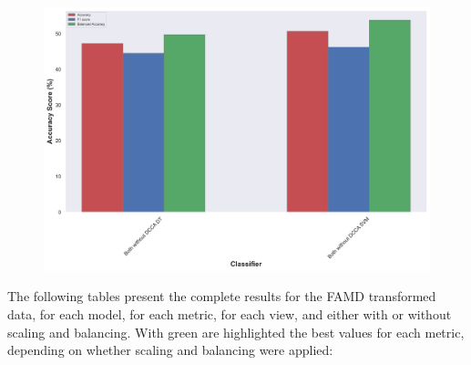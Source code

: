 {%

\begin{figure}[H]
    \centering
    \includegraphics[width=\textwidth]{figures/Results/FAMD/AdaBoost_FAMD_with.png}
    \caption[]{}
\end{figure}


The following tables present the complete results for the FAMD transformed data, for each model, for each metric, for each view, and either with or without scaling and balancing. With green are highlighted the best values for each metric, depending on whether scaling and balancing were applied:

}
